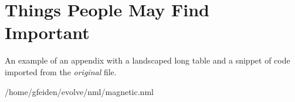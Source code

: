 
\chapter{Things People May Find Important}
\label{app:example1}

An example of an appendix with a landscaped long table and a snippet of
code imported from the {\it original} file.

\vspace{\baselineskip}
\onehalfspacing

                {/home/gfeiden/evolve/nml/magnetic.nml}
\doublespacing


